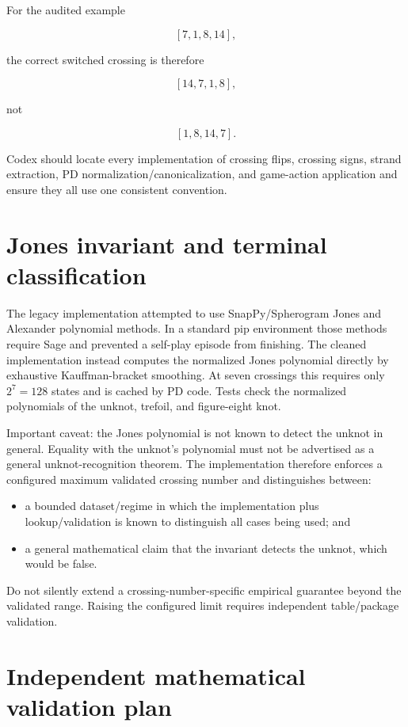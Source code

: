 \documentclass[11pt]{article}
\begin{document}
For the audited example

\[
[7,1,8,14],
\]

the correct switched crossing is therefore

\[
\boxed{[14,7,1,8]},
\]

not

\[
[1,8,14,7].
\]

Codex should locate every implementation of crossing flips, crossing signs, strand extraction, PD normalization/canonicalization, and game-action application and ensure they all use one consistent convention.

\section{Jones invariant and terminal classification}

The legacy implementation attempted to use SnapPy/Spherogram Jones and Alexander polynomial methods. In a standard pip environment those methods require Sage and prevented a self-play episode from finishing. The cleaned implementation instead computes the normalized Jones polynomial directly by exhaustive Kauffman-bracket smoothing. At seven crossings this requires only \(2^7=128\) states and is cached by PD code. Tests check the normalized polynomials of the unknot, trefoil, and figure-eight knot.

Important caveat: the Jones polynomial is not known to detect the unknot in general. Equality with the unknot's polynomial must not be advertised as a general unknot-recognition theorem. The implementation therefore enforces a configured maximum validated crossing number and distinguishes between:

\begin{itemize}
    \item a bounded dataset/regime in which the implementation plus lookup/validation is known to distinguish all cases being used; and
    \item a general mathematical claim that the invariant detects the unknot, which would be false.
\end{itemize}

Do not silently extend a crossing-number-specific empirical guarantee beyond the validated range. Raising the configured limit requires independent table/package validation.

\section{Independent mathematical validation plan}
\end{document}
